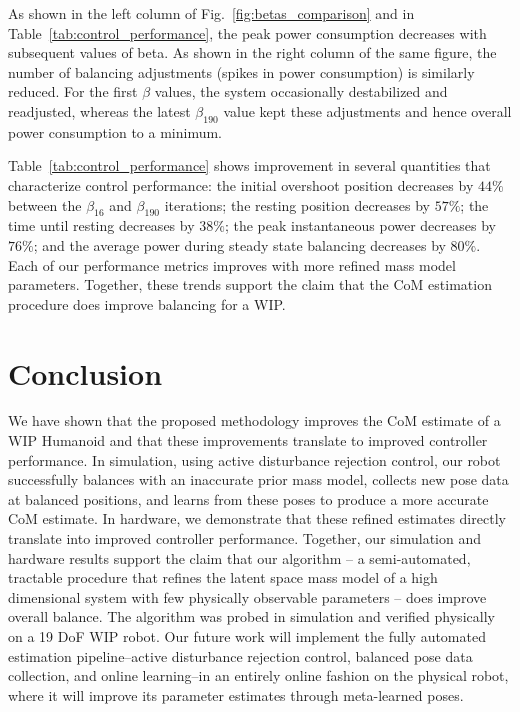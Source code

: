 \documentclass[letterpaper, 10 pt, conference]{ieeeconf}  %
\begin{document}
As shown in the left column of Fig.~\ref{fig:betas_comparison} and in Table~\ref{tab:control_performance}, the peak power consumption decreases with subsequent values of beta.  As shown in the right column of the same figure, the number of balancing adjustments (spikes in power consumption) is similarly reduced.  For the first $\beta$ values, the system occasionally destabilized and readjusted, whereas the latest $\beta_{190}$ value kept these adjustments and hence overall power consumption to a minimum.

Table~\ref{tab:control_performance} shows improvement in several quantities that characterize control performance: the initial overshoot position decreases by $44\%$ between the $\beta_{16}$ and $\beta_{190}$ iterations; the resting position decreases by $57\%$; the time until resting decreases by $38\%$; the peak instantaneous power decreases by $76\%$; and the average power during steady state balancing decreases by $80\%$.  Each of our performance metrics improves with more refined mass model parameters.  Together, these trends support the claim that the \ac{CoM} estimation procedure does improve balancing for a \ac{WIP}.


\section{Conclusion}
\label{sec:conclusion}
We have shown that the proposed methodology improves the \ac{CoM} estimate of a \ac{WIP} Humanoid and that these improvements translate to improved controller performance.
In simulation, using active disturbance rejection control, our robot successfully balances with an inaccurate prior mass model, collects new pose data at balanced positions, and learns from these poses to produce a more accurate \ac{CoM} estimate.
In hardware, we demonstrate that these refined estimates directly translate into improved controller performance.
Together, our simulation and hardware results support the claim that our algorithm -- a semi-automated, tractable procedure that refines the latent space mass model of a high dimensional system with few physically observable parameters -- does improve overall balance.  The algorithm was probed in simulation and verified physically on a 19 \ac{DoF} \ac{WIP} robot.
Our future work will implement the fully automated estimation pipeline--active disturbance rejection control, balanced pose data collection, and online learning--in an entirely online fashion on the physical robot, where it will improve its parameter estimates through meta-learned poses.
\end{document}
